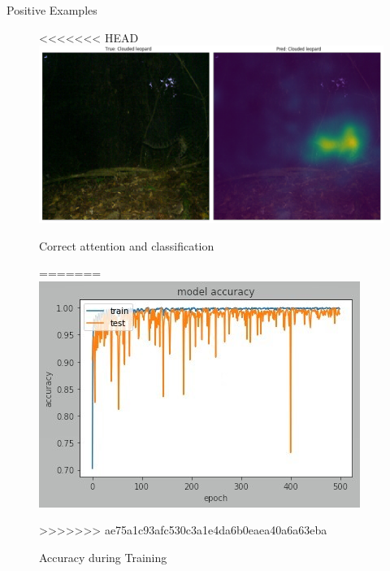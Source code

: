 \documentclass[10pt]{beamer}
\begin{document}
\begin{frame}{Positive Examples}
	\centering
	\begin{figure}
<<<<<<< HEAD
		\includegraphics[width=\columnwidth]{images/Attention_right5.png}
		\caption{Correct attention and classification}
=======
		\includegraphics[width=.9\columnwidth,height=\textheight,keepaspectratio]{images/Pretrain_acc_ResNet50_cropped_heavy_augment_lr0_0001.jpg}
		\caption{Accuracy during Training}
>>>>>>> ae75a1c93afc530c3a1e4da6b0eaea40a6a63eba
	\end{figure}
\end{frame}

\end{document}
